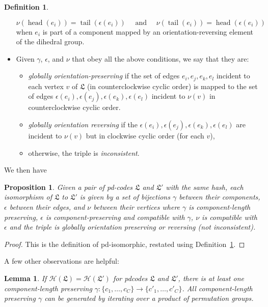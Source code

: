 \documentclass[amsmath,secnumarabic,floatfix,amssymb,nofootinbib,nobibnotes,letterpaper,11pt,tightenlines,showkeys]{revtex4}
\newtheorem{lemma}[theorem]{Lemma}
\newtheorem{proposition}[theorem]{Proposition}
\theoremstyle{definition}
\newtheorem{definition}[theorem]{Definition}
\newcommand{\head}{\operatorname{head}}
\newcommand{\tail}{\operatorname{tail}}
\let\mgp=\marginpar \marginparwidth18mm \marginparsep1mm
\def\marginpar#1{\mgp{\raggedright\tiny #1}}
\let\lbl=\label
\def\label#1{\lbl{#1}\ifinner\else\marginpar{\ref{#1} #1}\ignorespaces\fi}
\begin{document}
\begin{definition}
\begin{itemize}
\begin{equation*}
\nu(\head(e_i)) = \tail(\epsilon(e_i)) \quad \text{ and } \quad \nu(\tail(e_i)) = \head(\epsilon(e_i))
\end{equation*}
when $e_i$ is part of a component mapped by an orientation-reversing element of the dihedral group.
\item Given $\gamma$, $\epsilon$, and $\nu$ that obey all the above conditions, we say that they are:
\begin{itemize}
 \item \emph{globally orientation-preserving} if the set of edges $e_i, e_j, e_k, e_l$ incident to each vertex $v$ of $\mathfrak{L}$ (in counterclockwise cyclic order) is mapped to the set of edges $\epsilon(e_i), \epsilon(e_j), \epsilon(e_k), \epsilon(e_l)$ incident to $\nu(v)$ in counterclockwise cyclic order.
 \item \emph{globally orientation reversing} if the $\epsilon(e_i), \epsilon(e_j), \epsilon(e_k), \epsilon(e_l)$ are incident to $\nu(v)$ but in clockwise cyclic order (for each $v$),
 \item otherwise, the triple is \emph{inconsistent}.
\end{itemize}
\end{itemize}
\label{def:compatible}
\end{definition}

We then have
\begin{proposition}
Given a pair of pd-codes $\mathfrak{L}$ and $\mathfrak{L}'$ with the same hash, each isomorphism of $\mathfrak{L}$ to $\mathfrak{L}'$ is given by a set of bijections $\gamma$ between their components, $\epsilon$ between their edges, and $\nu$ between their vertices where $\gamma$ is component-length preserving, $\epsilon$ is component-preserving and compatible with $\gamma$, $\nu$ is compatible with $\epsilon$ and the triple is globally orientation preserving or reversing (not inconsistent).
\end{proposition}

\begin{proof}
This is the definition of pd-isomorphic, restated using Definition~\ref{def:compatible}.
\end{proof}

A few other observations are helpful:
\begin{lemma}
If $\mathcal{H}(\mathfrak{L}) = \mathcal{H}(\mathfrak{L}')$ for pdcodes $\mathfrak{L}$ and $\mathfrak{L}'$, there is at least one component-length preserving $\gamma : \{c_1,\dots,c_C\} \rightarrow \{c'_1,\dots,c'_C\}$. All component-length preserving $\gamma$ can be generated by iterating over a product of permutation groups.
\end{lemma}
\end{document}
